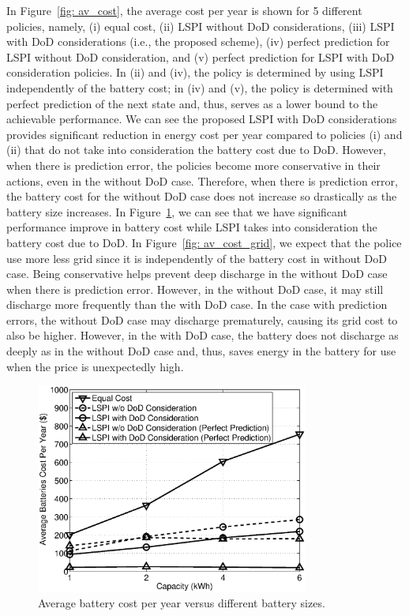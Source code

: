 In Figure~\ref{fig: av_cost}, the average cost per year is shown for 5 different policies, namely, (i) equal cost, (ii) LSPI without DoD considerations, (iii) LSPI with DoD considerations (i.e., the proposed scheme), (iv) perfect prediction for LSPI without DoD consideration, and (v) perfect prediction for LSPI with DoD consideration policies. In (ii) and (iv), the policy is determined by using LSPI independently of the battery cost; in (iv) and (v), the policy is determined with perfect prediction of the next state and, thus, serves as a lower bound to the achievable performance. We can see the proposed LSPI with DoD considerations provides significant reduction in energy cost per year compared to policies (i) and (ii) that do not take into consideration the battery cost due to DoD. However, when there is prediction error, the policies become more conservative in their actions, even in the without DoD case. Therefore, when there is prediction error, the battery cost for the without DoD case does not increase so drastically as the battery size increases. In Figure~\ref{fig: av_cost_batt}, we can see that we have significant performance improve in battery cost while LSPI takes into consideration the battery cost due to DoD. In Figure~\ref{fig: av_cost_grid}, we expect that the police use more less grid since it is independently of the battery cost in without DoD case. Being conservative helps prevent deep discharge in the without DoD case when there is prediction error. However, in the without DoD case, it may still discharge more frequently than the with DoD case. In the case with prediction errors, the without DoD case may discharge prematurely, causing its grid cost to also be higher. However, in the with DoD case, the battery does not discharge as deeply as in the without DoD case and, thus, saves energy in the battery for use when the price is unexpectedly high.

\begin{figure}[H]
  \centering
  \includegraphics[width = 0.8\textwidth]{fig/av_cost_batt.eps}
  \caption{Average battery cost per year versus different battery sizes.}
  \label{fig: av_cost_batt}
\end{figure}

